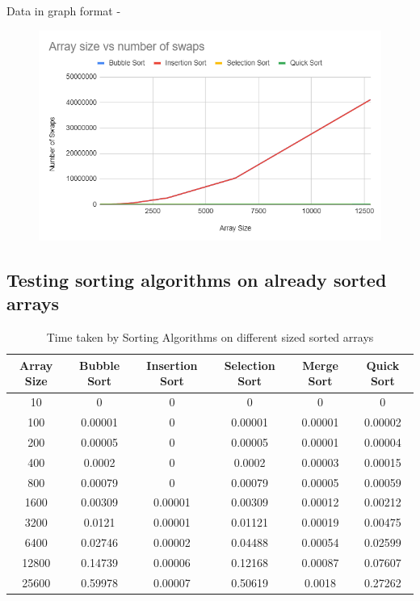 \documentclass{report}
\begin{document}
Data in graph format - 

\begin{figure}[H]
\centering
\includegraphics[scale=0.8]{numofswaps.png}
\end{figure}


\subsection{Testing sorting algorithms on already sorted arrays}

\begin{table}[H]
\centering
\begin{tabular}{|c|c|c|c|c|c|}
\hline
\textbf{Array Size} & \textbf{Bubble Sort} & \textbf{Insertion Sort} & \textbf{Selection Sort} & \textbf{Merge Sort} & \textbf{Quick Sort} \\ \hline
10 & 0 & 0 & 0 & 0 & 0 \\ \hline
100 & 0.00001 & 0 & 0.00001 & 0.00001 & 0.00002 \\ \hline
200 & 0.00005 & 0 & 0.00005 & 0.00001 & 0.00004 \\ \hline
400 & 0.0002 & 0 & 0.0002 & 0.00003 & 0.00015 \\ \hline
800 & 0.00079 & 0 & 0.00079 & 0.00005 & 0.00059 \\ \hline
1600 & 0.00309 & 0.00001 & 0.00309 & 0.00012 & 0.00212 \\ \hline
3200 & 0.0121 & 0.00001 & 0.01121 & 0.00019 & 0.00475 \\ \hline
6400 & 0.02746 & 0.00002 & 0.04488 & 0.00054 & 0.02599 \\ \hline
12800 & 0.14739 & 0.00006 & 0.12168 & 0.00087 & 0.07607 \\ \hline
25600 & 0.59978 & 0.00007 & 0.50619 & 0.0018 & 0.27262 \\ \hline
\end{tabular}
\caption{Time taken by Sorting Algorithms on different sized sorted arrays}
\end{table}
\end{document}
